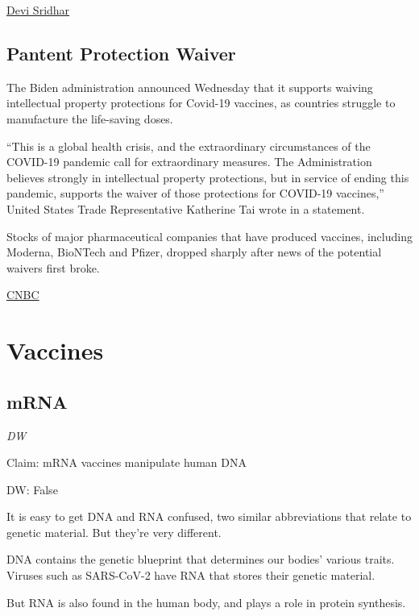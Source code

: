 \documentclass[
]{book}
\begin{document}
\href{https://nymag.com/intelligencer/2021/03/how-the-west-lost-covid-19.html}{Devi Sridhar}

\hypertarget{pantent-protection-waiver}{%
\section{Pantent Protection Waiver}\label{pantent-protection-waiver}}

The Biden administration announced Wednesday that it supports waiving intellectual property protections for Covid-19 vaccines, as countries struggle to manufacture the life-saving doses.

``This is a global health crisis, and the extraordinary circumstances of the COVID-19 pandemic call for extraordinary measures. The Administration believes strongly in intellectual property protections, but in service of ending this pandemic, supports the waiver of those protections for COVID-19 vaccines,'' United States Trade Representative Katherine Tai wrote in a statement.

Stocks of major pharmaceutical companies that have produced vaccines, including Moderna, BioNTech and Pfizer, dropped sharply after news of the potential waivers first broke.

\href{https://www.cnbc.com/2021/05/05/us-backs-covid-vaccine-intellectual-property-waivers-to-expand-access-to-shots-worldwide.html}{CNBC}

\hypertarget{vaccines}{%
\chapter{Vaccines}\label{vaccines}}

\hypertarget{mrna}{%
\section{mRNA}\label{mrna}}

\emph{DW}

Claim: mRNA vaccines manipulate human DNA

DW: False

It is easy to get DNA and RNA confused, two similar abbreviations that relate to genetic material. But they're very different.

DNA contains the genetic blueprint that determines our bodies' various traits. Viruses such as SARS-CoV-2 have RNA that stores their genetic material.

But RNA is also found in the human body, and plays a role in protein synthesis.
\end{document}
